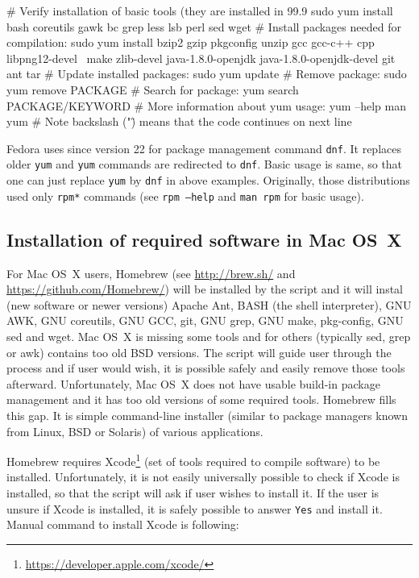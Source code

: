 \documentclass[a4paper, 11pt, twoside]{article}
\begin{document}
\begin{bashcode}
  # Verify installation of basic tools (they are installed in 99.9%
  sudo yum install bash coreutils gawk bc grep less lsb perl sed wget
  # Install packages needed for compilation:
  sudo yum install bzip2 gzip pkgconfig unzip gcc gcc-c++ cpp libpng12-devel \
    make zlib-devel java-1.8.0-openjdk java-1.8.0-openjdk-devel git ant tar
  # Update installed packages:
  sudo yum update
  # Remove package:
  sudo yum remove PACKAGE
  # Search for package:
  yum search PACKAGE/KEYWORD
  # More information about yum usage:
  yum --help
  man yum
  # Note backslash ("\") means that the code continues on next line
\end{bashcode}

Fedora uses since version 22 for package management command \texttt{dnf}. It replaces older \texttt{yum} and \texttt{yum} commands are redirected to \texttt{dnf}. Basic usage is same, so that one can just replace \texttt{yum} by \texttt{dnf} in above examples. Originally, those distributions used only \texttt{rpm*} commands (see \texttt{rpm --help} and \texttt{man rpm} for basic usage).

\subsection{Installation of required software in Mac OS~X}
\label{required-mac}

For Mac OS~X users, Homebrew (see \href{http://brew.sh/}{http://brew.sh/} and \href{https://github.com/Homebrew/}{https://github.com/Homebrew/}) will be installed by the script and it will instal (new software or newer versions) Apache Ant, BASH (the shell interpreter), GNU AWK, GNU coreutils, GNU GCC, git, GNU grep, GNU make, pkg-config, GNU sed and wget. Mac OS~X is missing some tools and for others (typically sed, grep or awk) contains too old BSD versions. The script will guide user through the process and if user would wish, it is possible safely and easily remove those tools afterward. Unfortunately, Mac OS~X does not have usable build-in package management and it has too old versions of some required tools. Homebrew fills this gap. It is simple command-line installer (similar to package managers known from Linux, BSD or Solaris) of various applications.

Homebrew requires Xcode\footnote{\href{https://developer.apple.com/xcode/}{https://developer.apple.com/xcode/}} (set of tools required to compile software) to be installed. Unfortunately, it is not easily universally possible to check if Xcode is installed, so that the script will ask if user wishes to install it. If the user is unsure if Xcode is installed, it is safely possible to answer \texttt{Yes} and install it. Manual command to install Xcode is following:
\end{document}
